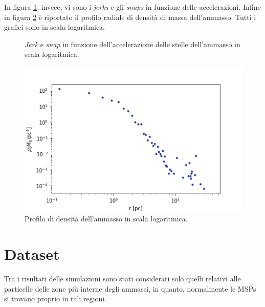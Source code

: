 In figura \ref{fig:cluster2}, invece, vi sono i \textit{jerks} e gli \textit{snaps} in funzione delle accelerazioni. Infine in figura \ref{fig:density} è riportato il profilo radiale di densità di massa dell'ammasso. Tutti i grafici sono in scala logaritmica.  
\begin{figure}[H]
\centering
{}
\qquad
{}
\caption{\textit{Jerk} e \textit{snap} in funzione dell'accelerazione delle stelle dell'ammasso in scala logaritmica.}
\label{fig:cluster2}
\end{figure}
\begin{figure}[H]
\begin{center}
\includegraphics[width=0.5\columnwidth]{images/density.png}
\end{center}
\caption{Profilo di densità dell'ammasso in scala logaritmica.}
\label{fig:density}
\end{figure}

\section{Dataset}
Tra i risultati delle simulazioni sono stati considerati solo quelli relativi alle particelle delle zone più interne degli ammassi, in quanto, normalmente le MSPs si trovano proprio in tali regioni. 


